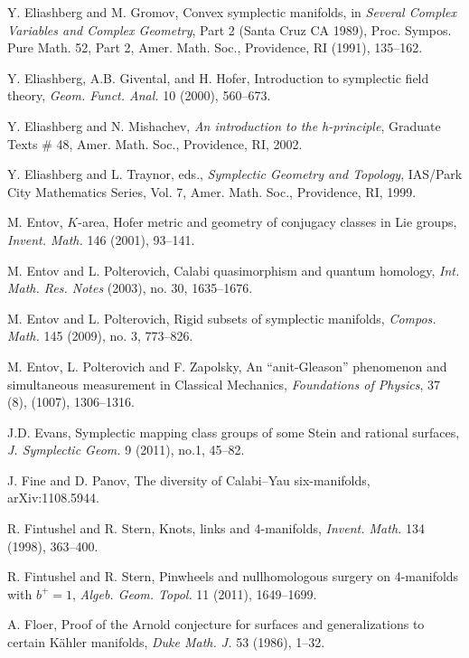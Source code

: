  Y. Eliashberg and M. Gromov, Convex symplectic manifolds, in \emph{Several Complex Variables and Complex Geometry}, Part 2 (Santa Cruz CA 1989), Proc. Sympos. Pure Math. 52, Part 2, Amer. Math. Soc., Providence, RI (1991), 135–162.

 Y. Eliashberg, A.B. Givental, and H. Hofer, Introduction to symplectic field theory, \emph{Geom. Funct. Anal.} 10 (2000), 560–673.

 Y. Eliashberg and N. Mishachev, \emph{An introduction to the h-principle}, Graduate Texts \# 48, Amer. Math. Soc., Providence, RI, 2002.

 Y. Eliashberg and L. Traynor, eds., \emph{Symplectic Geometry and Topology}, IAS/Park City Mathematics Series, Vol. 7, Amer. Math. Soc., Providence, RI, 1999.

 M. Entov, $K$-area, Hofer metric and geometry of conjugacy classes in Lie groups, \emph{Invent. Math.} 146 (2001), 93–141.

 M. Entov and L. Polterovich, Calabi quasimorphism and quantum homology, \emph{Int. Math. Res. Notes} (2003), no. 30, 1635–1676.

 M. Entov and L. Polterovich, Rigid subsets of symplectic manifolds, \emph{Compos. Math.} 145 (2009), no. 3, 773–826.

 M. Entov, L. Polterovich and F. Zapolsky, An “anit-Gleason” phenomenon and simultaneous measurement in Classical Mechanics, \emph{Foundations of Physics}, 37 (8), (1007), 1306–1316.

 J.D. Evans, Symplectic mapping class groups of some Stein and rational surfaces, \emph{J. Symplectic Geom.} 9 (2011), no.1, 45–82.

 J. Fine and D. Panov, The diversity of Calabi–Yau six-manifolds, arXiv:1108.5944.

 R. Fintushel and R. Stern, Knots, links and 4-manifolds, \emph{Invent. Math.} 134 (1998), 363–400.

 R. Fintushel and R. Stern, Pinwheels and nullhomologous surgery on 4-manifolds with $b^{+}=1$, \emph{Algeb. Geom. Topol.} 11 (2011), 1649–1699.

 A. Floer, Proof of the Arnold conjecture for surfaces and generalizations to certain Kähler manifolds, \emph{Duke Math. J.} 53 (1986), 1–32.

